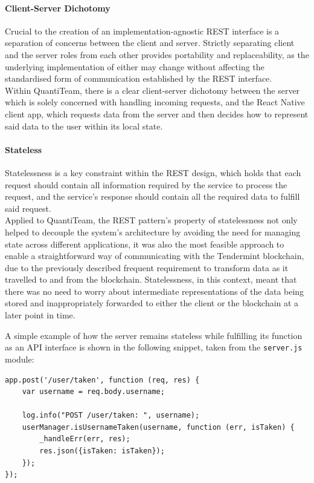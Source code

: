 \documentclass[12pt]{report}
\let\oldparagraph\paragraph
\renewcommand{\paragraph}[1]{\oldparagraph{#1}\mbox{}}
\begin{document}
\paragraph{Client-Server Dichotomy}\label{client-server-dichotomy}

Crucial to the creation of an implementation-agnostic REST interface is
a separation of concerns between the client and
server\cite{1rest}.
Strictly separating client and the server roles from each other provides
portability and replaceability, as the underlying implementation of
either may change without affecting the standardised form of
communication established by the REST interface.\\
Within QuantiTeam, there is a clear client-server dichotomy between the
server which is solely concerned with handling incoming requests, and
the React Native client app, which requests data from the server and
then decides how to represent said data to the user within its local
state.

\paragraph{Stateless}\label{stateless}

Statelessness is a key constraint within the REST design, which holds
that each request should contain all information required by the service
to process the request, and the service's response should contain all
the required data to fulfill said
request\cite{1rest}.\\
Applied to QuantiTeam, the REST pattern's property of statelessness not
only helped to decouple the system's architecture by avoiding the need
for managing state across different applications, it was also the most
feasible approach to enable a straightforward way of communicating with
the Tendermint blockchain, due to the previously described frequent
requirement to transform data as it travelled to and from the
blockchain. Statelessness, in this context, meant that there was no need
to worry about intermediate representations of the data being stored and
inappropriately forwarded to either the client or the blockchain at a
later point in time.

A simple example of how the server remains stateless while fulfilling
its function as an API interface is shown in the following snippet,
taken from the \texttt{server.js} module:

\begin{verbatim}
app.post('/user/taken', function (req, res) {
    var username = req.body.username;

    log.info("POST /user/taken: ", username);
    userManager.isUsernameTaken(username, function (err, isTaken) {
        _handleErr(err, res);
        res.json({isTaken: isTaken});
    });
});
\end{verbatim}
\end{document}
